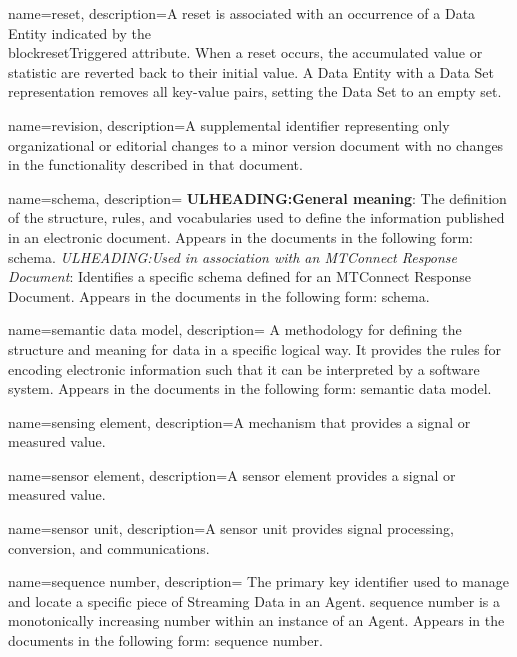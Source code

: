{
    name={reset},
	description={A reset is associated with an occurrence of a \gls{Data Entity} indicated by the \\block{resetTriggered} attribute. When a reset occurs, the accumulated value or statistic are reverted back to their initial value. A \gls{Data Entity} with a \gls{Data Set} representation removes all \glspl{key-value pair}, setting the \gls{Data Set} to an empty set.}
}

{
    name={revision},
	description={A supplemental identifier representing only organizational or editorial changes to a \gls{minor} version document with no changes in the functionality described in that document.}
}

{
    name={schema},
	description={
	\textbf{ULHEADING:General meaning}:
	The definition of the structure, rules, and vocabularies used to define the information published in an electronic document.
	Appears in the documents in the following form: schema.
	\textit{ULHEADING:Used in association with an \gls{MTConnect Response Document}}:
	Identifies a specific schema defined for an \gls{MTConnect Response Document}.
	Appears in the documents in the following form: \gls{schema}.
}
}

{
    name={semantic data model},
	description={
	A methodology for defining the structure and meaning for data in a specific logical way.  
	It provides the rules for encoding electronic information such that it can be interpreted by a software system.  
	Appears in the documents in the following form: \gls{semantic data model}.
}
}

{
    name={sensing element},
	description={A mechanism that provides a signal or measured value.}
}

{
    name={sensor element},
	description={A \gls{sensor element} provides a signal or measured value.}
}

{
    name={sensor unit},
	description={A \gls{sensor unit} provides signal processing, conversion, and communications.}
}

{
    name={sequence number},
	description={
	The primary key identifier used to manage and locate a specific piece of \gls{Streaming Data} in an \gls{Agent}.
	\gls{sequence number} is a monotonically increasing number within an instance of an \gls{Agent}.
	Appears in the documents in the following form: \gls{sequence number}.
}
}

